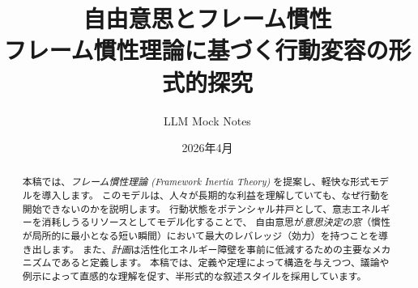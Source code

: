 




\title{\textbf{自由意思とフレーム慣性}\\[6pt]
       \large フレーム慣性理論に基づく行動変容の形式的探究}
\author{LLM Mock Notes}
\date{2026年4月}
\maketitle

\begin{abstract}
本稿では、\emph{フレーム慣性理論 (Framework Inertia Theory)} を提案し、軽快な形式モデルを導入します。
このモデルは、人々が長期的な利益を理解していても、なぜ行動を開始できないのかを説明します。
行動状態をポテンシャル井戸として、意志エネルギーを消耗しうるリソースとしてモデル化することで、
自由意思が\emph{意思決定の窓}（慣性が局所的に最小となる短い瞬間）において最大のレバレッジ（効力）を持つことを導き出します。
また、\emph{計画}は活性化エネルギー障壁を事前に低減するための主要なメカニズムであると定義します。
本稿では、定義や定理によって構造を与えつつ、議論や例示によって直感的な理解を促す、半形式的な叙述スタイルを採用しています。
\end{abstract}

\tableofcontents
\newpage




